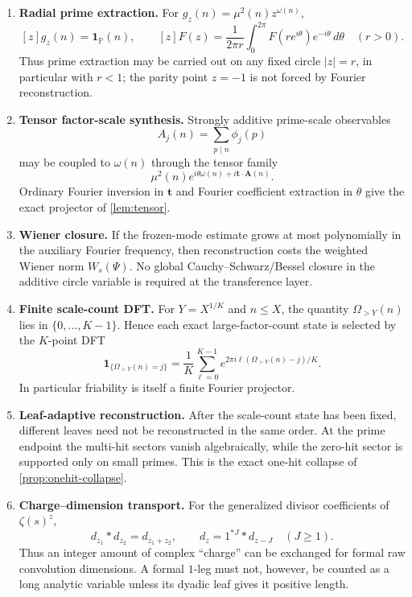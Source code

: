 \documentclass[11pt]{article}
\theoremstyle{definition}
\theoremstyle{remark}
\newcommand{\Pp}{\mathbb P}
\newcommand{\1}{\mathbf 1}
\begin{document}
\begin{enumerate}[label=\textbf{G\arabic*.},leftmargin=3em]
\item \textbf{Radial prime extraction.}
For \(g_z(n)=\mu^2(n)z^{\omega(n)}\),
\[
 [z]g_z(n)=\1_{\Pp}(n),
 \qquad
 [z]F(z)=\frac{1}{2\pi r}\int_0^{2\pi}F(re^{i\theta})e^{-i\theta}\,d\theta
 \quad(r>0).
\]
Thus prime extraction may be carried out on any fixed circle \(|z|=r\), in
particular with \(r<1\); the parity point \(z=-1\) is not forced by Fourier
reconstruction.

\item \textbf{Tensor factor-scale synthesis.}
Strongly additive prime-scale observables
\[
 A_j(n)=\sum_{p\mid n}\phi_j(p)
\]
may be coupled to \(\omega(n)\) through the tensor family
\[
 \mu^2(n)e^{i\theta\omega(n)+i\bm t\cdot\bm A(n)}.
\]
Ordinary Fourier inversion in \(\bm t\) and Fourier coefficient extraction in
\(\theta\) give the exact projector of \cref{lem:tensor}.

\item \textbf{Wiener closure.}
If the frozen-mode estimate grows at most polynomially in the auxiliary Fourier
frequency, then reconstruction costs the weighted Wiener norm \(W_s(\Psi)\).
No global Cauchy--Schwarz/Bessel closure in the additive circle variable is
required at the transference layer.

\item \textbf{Finite scale-count DFT.}
For \(Y=X^{1/K}\) and \(n\le X\), the quantity \(\Omega_{>Y}(n)\) lies in
\(\{0,\ldots,K-1\}\).  Hence each exact large-factor-count state is selected by
the \(K\)-point DFT
\[
 \1_{\{\Omega_{>Y}(n)=j\}}
 =\frac1K\sum_{\ell=0}^{K-1}
 e^{2\pi i\ell(\Omega_{>Y}(n)-j)/K}.
\]
In particular friability is itself a finite Fourier projector.

\item \textbf{Leaf-adaptive reconstruction.}
After the scale-count state has been fixed, different leaves need not be
reconstructed in the same order.  At the prime endpoint the multi-hit sectors
vanish algebraically, while the zero-hit sector is supported only on small
primes.  This is the exact one-hit collapse of \cref{prop:onehit-collapse}.

\item \textbf{Charge--dimension transport.}
For the generalized divisor coefficients of \(\zeta(s)^z\),
\[
 d_{z_1}*d_{z_2}=d_{z_1+z_2},
 \qquad
 d_z=1^{*J}*d_{z-J}\quad(J\ge1).
\]
Thus an integer amount of complex ``charge'' can be exchanged for formal raw
convolution dimensions.  A formal \(1\)-leg must not, however, be counted as a
long analytic variable unless its dyadic leaf gives it positive length.


\end{enumerate}
\end{document}
